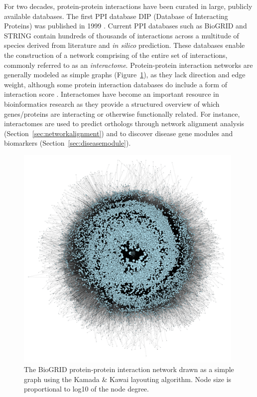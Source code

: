 For two decades, protein-protein interactions have been curated in large, publicly available databases. The first PPI database DIP (Database of Interacting Proteins) was published in 1999 \cite{Xenarios2000}. Current PPI databases such as BioGRID \cite{Stark2006} and STRING \cite{Szklarczyk2014} contain hundreds of thousands of interactions across a multitude of species derived from literature and \emph{in silico} prediction. These databases enable the construction of a network comprising of the entire set of interactions, commonly referred to as an \emph{interactome}. Protein-protein interaction networks are generally modeled as simple graphs (Figure~\ref{fig:ppinetwork}), as they lack direction and edge weight, although some protein interaction databases do include a form of interaction score \cite{Szklarczyk2014,Alanis-Lobato2016}. Interactomes have become an important resource in bioinformatics research as they provide a structured overview of which genes/proteins are interacting or otherwise functionally related. For instance, interactomes are used to predict orthologs through network alignment analysis (Section~\ref{sec:networkalignment}) and to discover disease gene modules and biomarkers (Section~\ref{sec:diseasemodule}).
%
\begin{figure}
    \centering
    \includegraphics[width=11cm]{figures/ppi_biogrid_kk.jpg}
    \caption{The BioGRID protein-protein interaction network drawn as a simple graph using the Kamada \& Kawai layouting algorithm. Node size is proportional to log10 of the node degree.}
    \label{fig:ppinetwork}
\end{figure}

